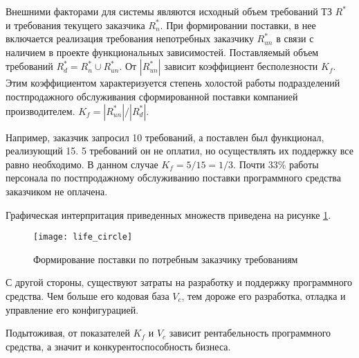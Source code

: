 
Внешними факторами для системы являются исходный объем требований ТЗ $R^*$ и требования текущего заказчика $R^{*}_{n}$. При формировании поставки, в нее включается реализация требования непотребных заказчику $R^{*}_{un}$ в связи с наличием в проекте функциональных зависимостей. Поставляемый объем требований $R^{*}_{d} = R^{*}_{n} \cup R^{*}_{un}$. От $|R^{*}_{un}|$ зависит коэффициент бесполезности $K_{f}$. Этим коэффициентом характеризуется степень холостой работы подразделений постпродажного обслуживания сформированной поставки компанией производителем. $K_{f} = |R^{*}_{un}| / |R^{*}_{d}|$.

Например, заказчик запросил 10 требований, а поставлен был функционал, реализующий 15. 5 требований он не оплатил, но осуществлять их поддержку все равно необходимо. В данном случае $K_{f} = 5 / 15 = 1/3$. Почти 33\% работы персонала по постпродажному обслуживанию поставки программного средства заказчиком не оплачена.

Графическая интерпритация приведенных множеств приведена на рисунке \ref{fig:life_circle}.

\begin{figure}[H]
    \centering
    \texttt{[image: life\_circle]}
    \caption{Формирование поставки по потребным заказчику требованиям}
    \label{fig:life_circle}
\end{figure}

С другой стороны, существуют затраты на разработку и поддержку программного средства. Чем больше его кодовая база $V_{c}$, тем дороже его разработка, отладка и управление его конфигурацией.

Подытоживая, от показателей $K_{f}$ и $V_{c}$ зависит рентабельность программного средства, а значит и конкурентоспособность бизнеса.